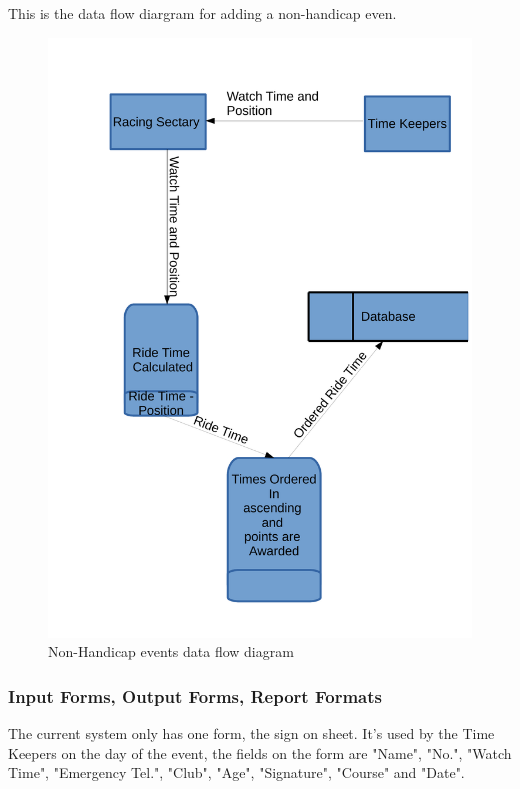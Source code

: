 This is the data flow diargram for adding a non-handicap even.
\begin{figure}[H]
    \includegraphics[width=\textwidth]{./Non-HandicapDFD.pdf}
    \caption{Non-Handicap events data flow diagram} \label{fig:non-handicap_DFD}
\end{figure}

\subsubsection{Input Forms, Output Forms, Report Formats}
The current system only has one form, the sign on sheet. It's used by the Time Keepers on the day of the event, the fields on the form are "Name", "No.", "Watch Time", "Emergency Tel.", "Club", "Age", "Signature", "Course" and "Date".

